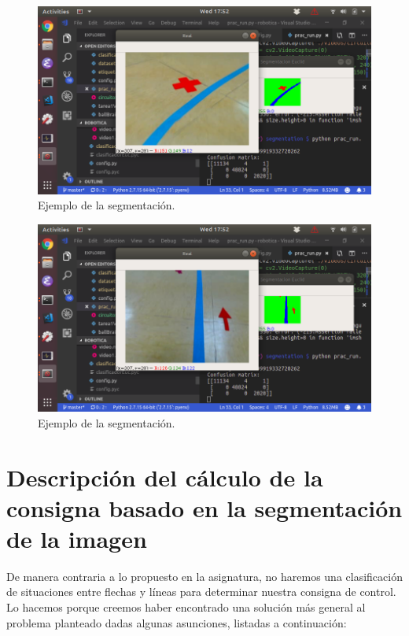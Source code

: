 \documentclass{article}
\begin{document}
	\begin{figure}[H]
	    \centering
	    \includegraphics[width=12cm]{./figures/figura3.png}
	    \caption{Ejemplo de la segmentación.}
	    \label{fig:figura3}
	\end{figure}

	\begin{figure}[H]
	    \centering
	    \includegraphics[width=12cm]{./figures/figura4.png}
	    \caption{Ejemplo de la segmentación.}
	    \label{fig:figura4}
	\end{figure}

\section{Descripción del cálculo de la consigna basado en la segmentación de la imagen}
    De manera contraria a lo propuesto en la asignatura, no haremos una clasificación de situaciones entre flechas y líneas para determinar nuestra consigna de control. Lo hacemos porque creemos haber encontrado una solución más general al problema planteado dadas algunas asunciones, listadas a continuación:
\end{document}
